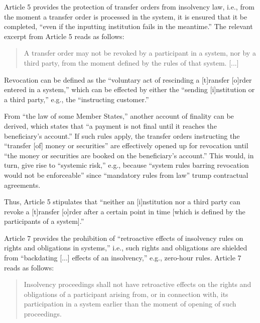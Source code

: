 Article 5 provides the protection of transfer orders from insolvency law, i.e., from the moment a transfer order is processed in the system, it is ensured that it be completed, ``even if the inputting institution fails in the meantime.'' \autocite[19]{cpmi2001}
The relevant excerpt from Article 5 reads as follows: \autocite{eu1998sfd}

\begin{quote}
	A transfer order may not be revoked by a participant in a system, nor by a third party, from the moment defined by the rules of that system. [...]
\end{quote}

Revocation can be defined as the ``voluntary act of rescinding a [t]ransfer [o]rder entered in a system,'' which can be effected by either the ``sending [i]nstitution or a third party,'' e.g., the ``instructing customer.'' \autocite[51]{vereecken2003}

From ``the law of some Member States,'' another account of finality can be derived, which states that ``a payment is not final until it reaches the beneficiary's account.'' \autocite[52]{vereecken2003}
If such rules apply, the transfer orders instructing the ``transfer [of] money or securities'' are effectively opened up for revocation until ``the money or securities are booked on the beneficiary's account.'' \autocite[52]{vereecken2003}
This would, in turn, give rise to ``systemic risk,'' e.g., because ``system rules barring revocation would not be enforceable'' since ``mandatory rules from law'' trump contractual agreements. \autocite[52]{vereecken2003}

Thus, Article 5 stipulates that ``neither an [i]nstitution nor a third party can revoke a [t]ransfer [o]rder after a certain point in time [which is defined by the participants of a system].'' \autocite[52]{vereecken2003}

Article 7 provides the prohibition of ``retroactive effects of insolvency rules on rights and obligations in systems,'' i.e., such rights and obligations are shielded from ``backdating [...] effects of an insolvency,'' e.g., zero-hour rules. \autocite[19]{cpmi2001}
Article 7 reads as follows: \autocite{eu1998sfd}

\begin{quote}
	Insolvency proceedings shall not have retroactive effects on the rights and obligations of a participant arising from, or in connection with, its participation in a system earlier than the moment of opening of such proceedings.
\end{quote}

